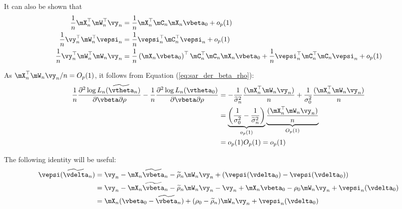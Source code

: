 \documentclass[english,12pt]{book}\usepackage[]{graphicx}\usepackage[]{xcolor}
\begin{document}
\begin{subappendices}
\begin{enumerate}
   It can also be shown that
   \begin{equation*}
    \begin{aligned}
      \frac{1}{n}\mX_n^\top\mW_n^\top\vy_n & = \frac{1}{n}\mX_n^\top\mC_n\mX_n\vbeta_0 + o_p(1) \\
      \frac{1}{n}\vy_n^{\top}\mW_n^{\top}\vepsi_n &= \frac{1}{n}\vepsi_n^\top\mC_n^{\top}\vepsi_n + o_p(1) \\
      \frac{1}{n}\vy_n^\top\mW_n^\top\mW_n\vy_n & = \frac{1}{n}\left(\mX_n\vbeta_0\right)^\top\mC_n^\top\mC_n\mX_n\vbeta_0 + \frac{1}{n}\vepsi_n^\top\mC_n^\top\mC_n\vepsi_n + o_p(1)
    \end{aligned}
   \end{equation*}
   
   
   As $\mX_n^\top\mW_n\vy_n /n = O_p(1)$, it follows from Equation (\ref{eq:sar_der_beta_rho}):
   \begin{equation*}
    \begin{aligned}
    \frac{1}{n}\frac{\partial^2 \log L_n(\widetilde{\vtheta}_n)}{\partial \vbeta \partial \rho} - \frac{1}{n}\frac{\partial^2 \log L_n(\vtheta_0)}{\partial \vbeta \partial \rho} & = - \frac{1}{\widetilde{\sigma}^2_n}\frac{(\mX^\top_n \mW_n\vy_n)}{n} + \frac{1}{\sigma^2_0}\frac{(\mX^\top_n \mW_n\vy_n)}{n} \\
    & = \underbrace{\left(\frac{1}{\sigma^2_0} - \frac{1}{\widetilde{\sigma}^2_n}\right)}_{o_p(1)}\underbrace{\frac{(\mX^\top_n \mW_n\vy_n)}{n}}_{O_p(1)} \\
    & = o_p(1)O_p(1)  = o_p(1)
    \end{aligned}
   \end{equation*} 
   
   The following identity will be useful:
   \begin{equation}\label{eq:error_slm_lee}
    \begin{aligned}
    \vepsi(\widetilde{\vdelta}_n) & = \vy_n - \mX_n\widetilde{\vbeta}_n - \widetilde{\rho}_n\mW_n\vy_n +(\vepsi(\vdelta_0) -  \vepsi(\vdelta_0)) \\
    & = \vy_n - \mX_n\widetilde{\vbeta}_n - \widetilde{\rho}_n\mW_n\vy_n - \vy_n + \mX_n\vbeta_0 - \rho_0\mW_n\vy_n + \vepsi_n(\vdelta_0) \\
    & = \mX_n(\vbeta_0 - \widetilde{\vbeta}_n) + (\rho_0 - \widetilde{\rho}_n)\mW_n\vy_n + \vepsi_n(\vdelta_0) 
    \end{aligned}
   \end{equation}
   

\end{enumerate}
\end{subappendices}
\end{document}
